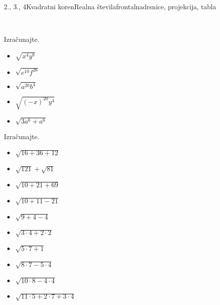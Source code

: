 \begin{priprava}{2., 3., 4}{}{Kvadratni koren}{Realna števila}{frontalna}{drsnice, projekcija, tabla}
\begin{multicols}{2}
            ~~
        
            \begin{naloga}
                Izračunajte.
                \begin{itemize}
                        \item $\sqrt{x^4y^8}$ 
                        \item $\sqrt{e^{10}f^{26}}$ 
                        \item $\sqrt{a^{20}b^4}$ 
                        \item $\sqrt{(-x)^{20}y^4}$ 
                        \item $\sqrt{3a^6+a^6}$ 
                \end{itemize}
            \end{naloga}
        


        
            \begin{naloga}
                Izračunajte.
                \begin{itemize}
                        \item $\sqrt{16+36+12}$ 
                        \item $\sqrt{121}+\sqrt{81}$ 
                        \item $\sqrt{10+21+69}$ 
                        \item $\sqrt{10+11-21}$ 
                        \item $\sqrt{9+4-4}$ 
                        \item $\sqrt{3\cdot 4+2\cdot 2}$ 
                        \item $\sqrt{5\cdot 7 +1}$ 
                        \item $\sqrt{8\cdot 7-5\cdot 4}$ 
                        \item $\sqrt{10\cdot 8-4\cdot 4}$ 
                        \item $\sqrt{11\cdot 5+2\cdot 7+3\cdot 4}$ 
                \end{itemize}
            \end{naloga}
        
            ~~~~\\~\\~\\
        

\end{multicols}
\end{priprava}
